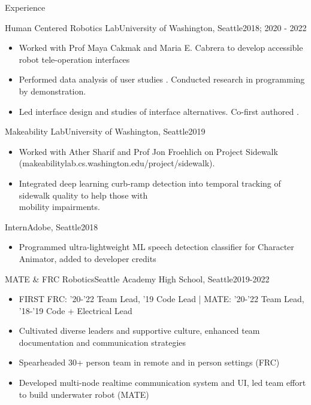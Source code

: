 \documentclass[]{mcdowellcv}
\begin{document}
	\begin{cvsection}{Experience}
		\begin{cvsubsection}{Human Centered Robotics Lab}{University of Washington, Seattle}{2018; 2020 - 2022}
			\begin{itemize}
            \item Worked with Prof Maya Cakmak and Maria E. Cabrera to develop accessible robot tele-operation interfaces
            \item Performed data analysis of user studies \cite{CabreraBDC21}. Conducted research in programming by demonstration.
            \item Led interface design and studies of interface alternatives. Co-first authored  \cite{CabreraDKBC21}. 
			\end{itemize}
		\end{cvsubsection}
		
		\begin{cvsubsection}{Makeability Lab}{University of Washington, Seattle}{2019}	
			\begin{itemize}
            	\item Worked with Ather Sharif and Prof Jon Froehlich on Project Sidewalk (makeabilitylab.cs.washington.edu/project/sidewalk). 
                    \item Integrated deep learning curb-ramp detection into temporal tracking of sidewalk quality to help those with \\ mobility impairments. \cite{SharifGSBFWDF21}
			\end{itemize}
		\end{cvsubsection}

            \begin{cvsubsection}{Intern}{Adobe, Seattle}{2018}	
			\begin{itemize}
            	\item Programmed ultra-lightweight ML speech detection classifier for Character Animator, added to developer credits
			\end{itemize}
		\end{cvsubsection}

              \begin{cvsubsection}{MATE \& FRC Robotics}{Seattle Academy High School, Seattle}{2019-2022}	
            \begin{itemize}
                \item FIRST FRC:  '20-'22 Team Lead,  '19 Code Lead | MATE: '20-'22 Team Lead, '18-'19 Code + Electrical Lead
                \item Cultivated diverse leaders and supportive culture, enhanced team documentation and communication strategies
                \item Spearheaded 30+ person team in remote and in person settings (FRC)
                \item Developed multi-node realtime communication system and UI, led team effort to build underwater robot (MATE)
            \end{itemize}
        \end{cvsubsection}

	\end{cvsection}
\end{document}
